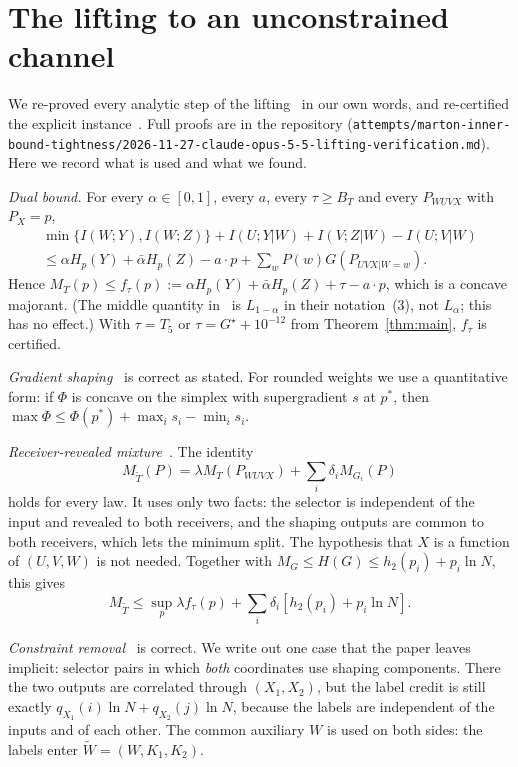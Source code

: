 \documentclass[11pt,draftclsnofoot,onecolumn,journal]{IEEEtran}
\newcommand{\ab}{\bar\alpha}
\begin{document}
\section{The lifting to an unconstrained channel}\label{sec:lift}

We re-proved every analytic step of the lifting~\cite[Sec.~II, App.~B--E]{HLL} in our own words,
and re-certified the explicit instance~\cite[(30)--(43)]{HLL}. Full proofs are in the repository
(\texttt{attempts/marton-inner-bound-tightness/}\allowbreak\texttt{2026-11-27-claude-opus-5-5-lifting-verification.md}).
Here we record what is used and what we found.

\emph{Dual bound.} For every $\alpha\in[0,1]$, every $a$, every $\tau\ge B_T$ and every
$P_{WUVX}$ with $P_X=p$,
\begin{multline*}
\min\{I(W;Y),I(W;Z)\}+I(U;Y|W)+I(V;Z|W)-I(U;V|W)\\
\le\alpha H_p(Y)+\ab H_p(Z)-a\cdot p+\textstyle\sum_wP(w)G(P_{UVX|W=w}).
\end{multline*}
Hence $M_T(p)\le f_\tau(p):=\alpha H_p(Y)+\ab H_p(Z)+\tau-a\cdot p$, which is a concave majorant.
(The middle quantity in~\cite[(24)]{HLL} is $L_{1-\alpha}$ in their notation~(3), not $L_\alpha$;
this has no effect.) With $\tau=T_5$ or $\tau=G^\star+10^{-12}$ from Theorem~\ref{thm:main},
$f_\tau$ is certified.

\emph{Gradient shaping}~\cite[Thm.~2]{HLL} is correct as stated. For rounded weights we use a
quantitative form: if $\Phi$ is concave on the simplex with supergradient $s$ at $p^*$, then
$\max\Phi\le\Phi(p^*)+\max_is_i-\min_is_i$.

\emph{Receiver-revealed mixture}~\cite[Prop.~3, (9), (12)]{HLL}. The identity
\[M_{\tilde T}(P)=\lambda M_T(P_{WUVX})+\textstyle\sum_i\delta_iM_{G_i}(P)\]
holds for every law. It uses
only two facts: the selector is independent of the input and revealed to both receivers, and the
shaping outputs are common to both receivers, which lets the minimum split. The hypothesis that
$X$ is a function of $(U,V,W)$ is not needed. Together with $M_G\le H(G)\le h_2(p_i)+p_i\ln N$,
this gives
\[M_{\tilde T}\le\sup_p\lambda f_\tau(p)+\textstyle\sum_i\delta_i[h_2(p_i)+p_i\ln N].\]

\emph{Constraint removal}~\cite[Thm.~4]{HLL} is correct. We write out one case that the paper
leaves implicit: selector pairs in which \emph{both} coordinates use shaping components. There
the two outputs are correlated through $(X_1,X_2)$, but the label credit is still exactly
$q_{X_1}(i)\ln N+q_{X_2}(j)\ln N$, because the labels are independent of the inputs and of each
other. The common auxiliary $W$ is used on both sides: the labels enter $\tilde W=(W,K_1,K_2)$.
\end{document}
